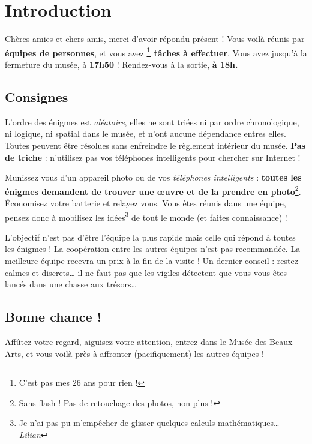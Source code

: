 \chapter{Introduction}

\vspace*{-30pt}

Chères amies et chers amis, merci d'avoir répondu présent !
%
Vous voilà réunis par \textbf{équipes de \intervalparequipe{} personnes},
et vous avez \textbf{\nbenigmes{}\footnote{C'est pas mes $26$ ans pour rien !} tâches à effectuer}.
%
Vous avez jusqu'à la fermeture du musée, à \textbf{17h50} !
%
Rendez-vous à la sortie, \textbf{à 18h.}


\section*{Consignes}

L'ordre des énigmes est \emph{aléatoire}, elles ne sont triées ni par ordre chronologique, ni logique, ni spatial dans le musée, et n'ont aucune dépendance entres elles.
%
Toutes peuvent être résolues sans enfreindre le règlement intérieur du musée.
\textbf{Pas de triche} : n'utilisez pas vos téléphones intelligents pour chercher sur Internet !

Munissez vous d'un appareil photo ou de vos \emph{téléphones intelligents} : \textbf{toutes les énigmes demandent de trouver une œuvre et de la prendre en photo}\footnote{Sans flash ! Pas de retouchage des photos, non plus !}.
Économisez votre batterie et relayez vous.
%
Vous êtes réunis dans une équipe, pensez donc à mobilisez les idées\footnote{Je n'ai pas pu m'empêcher de glisser quelques calculs mathématiques… -- \emph{Lilian}} de tout le monde (et faites connaissance) !

L'objectif n'est pas d'être l'équipe la plus rapide mais celle qui répond à toutes les énigmes !
La coopération entre les autres équipes n'est pas recommandée.
La meilleure équipe recevra un prix à la fin de la visite !
%
Un dernier conseil : restez calmes et discrets… il ne faut pas que les vigiles détectent que vous vous êtes lancés dans une chasse aux trésors…


\section*{Bonne chance !}
Affûtez votre regard, aiguisez votre attention, entrez dans le Musée des Beaux Arts, et vous voilà près à affronter (pacifiquement) les autres équipes !
